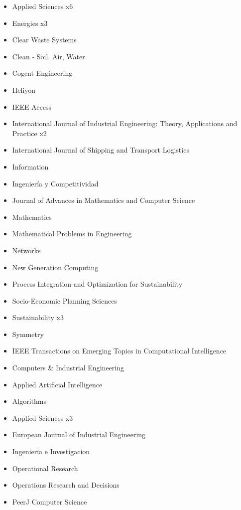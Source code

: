{\begin{itemize}
\item Applied Sciences x6
\item Energies x3
\item Clear Waste Systems
\item Clean - Soil, Air, Water
\item Cogent Engineering
\item Heliyon
\item IEEE Access
\item International Journal of Industrial Engineering: Theory, Applications and Practice x2
\item International Journal of Shipping and Transport Logistics
\item Information
\item Ingenier\'ia y Competitividad
\item Journal of Advances in Mathematics and Computer Science
\item Mathematics
\item Mathematical Problems in Engineering
\item Networks
\item New Generation Computing
\item Process Integration and Optimization for Sustainability
\item Socio-Economic Planning Sciences
\item Sustainability x3
\item Symmetry
\item IEEE Transactions on Emerging Topics in Computational Intelligence 
\end{itemize}
}

{\begin{itemize}
\item Computers \& Industrial Engineering
\item Applied Artificial Intelligence
\item Algorithms
\item Applied Sciences x3
\item European Journal of Industrial Engineering
\item Ingenieria e Investigacion
\item Operational Research
\item Operations Research and Decisions
\item PeerJ Computer Science
\end{itemize}
}

